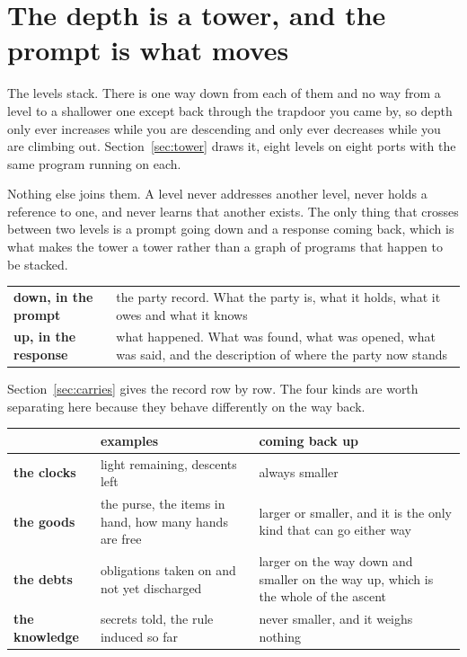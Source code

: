 \documentclass[11pt,a4paper]{article}
\begin{document}
\section{The depth is a tower, and the prompt is what moves}
\label{sec:towerprompt}

The levels stack. There is one way down from each of them and no way from a level to a shallower
one except back through the trapdoor you came by, so depth only ever increases while you are
descending and only ever decreases while you are climbing out. Section~\ref{sec:tower} draws it,
eight levels on eight ports with the same program running on each.

Nothing else joins them. A level never addresses another level, never holds a reference to one, and
never learns that another exists. The only thing that crosses between two levels is a prompt going
down and a response coming back, which is what makes the tower a tower rather than a graph of
programs that happen to be stacked.

\begin{center}
\begin{tabular}{@{}l@{\hspace{4mm}}>{\raggedright\arraybackslash}p{}@{}}
\toprule
\textbf{down, in the prompt} & the party record. What the party is, what it holds, what it owes and
what it knows \\[1mm]
\textbf{up, in the response} & what happened. What was found, what was opened, what was said, and
the description of where the party now stands \\
\bottomrule
\end{tabular}
\end{center}

Section~\ref{sec:carries} gives the record row by row. The four kinds are worth separating here
because they behave differently on the way back.

\begin{center}
\begin{tabular}{@{}l@{\hspace{4mm}}>{\raggedright\arraybackslash}p{}@{\hspace{4mm}}>{\raggedright\arraybackslash}p{}@{}}
\toprule
& \textbf{examples} & \textbf{coming back up} \\
\midrule
\textbf{the clocks}  & light remaining, descents left & always smaller \\[1mm]
\textbf{the goods}   & the purse, the items in hand, how many hands are free &
larger or smaller, and it is the only kind that can go either way \\[1mm]
\textbf{the debts}   & obligations taken on and not yet discharged &
larger on the way down and smaller on the way up, which is the whole of the ascent \\[1mm]
\textbf{the knowledge} & secrets told, the rule induced so far &
never smaller, and it weighs nothing \\
\bottomrule
\end{tabular}
\end{center}
\end{document}

